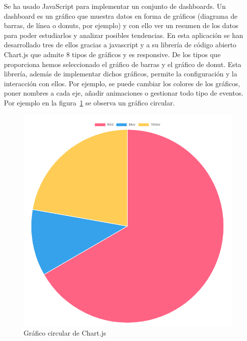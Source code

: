\documentclass[a4paper, 12pt]{book}
\begin{document}
\begin{enumerate}[a)]
    Se ha usado JavaScript para implementar un conjunto de dashboards. Un dashboard es un gráfico que muestra datos en forma de gráficos (diagrama de barras, de línea o donuts, por ejemplo) y con ello ver un resumen de los datos para poder estudiarlos y analizar posibles tendencias. En esta aplicación se han desarrollado tres de ellos gracias a javascript y a su librería de código abierto Chart.js que admite 8 tipos de gráficos y es responsive. De los tipos que proporciona hemos seleccionado el gráfico de barras y el gráfico de donut. Esta librería, además de implementar dichos gráficos, permite la configuración y la interacción con ellos. Por ejemplo, se puede cambiar los colores de los gráficos, poner nombres a cada eje, añadir animaciones o gestionar todo tipo de eventos. Por ejemplo en la figura~\ref{figura:js} se observa un gráfico circular.
    \begin{figure}[h]
            \centering
            \includegraphics[scale=0.25]{img/pie.PNG}
            \caption{Gráfico circular de Chart.js}
            \label{figura:js}
        \end{figure}
    
       
\end{enumerate}
\end{document}
